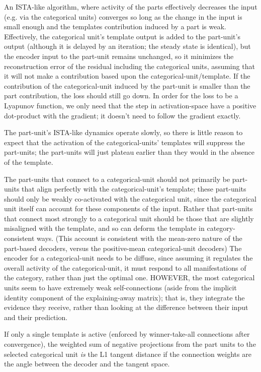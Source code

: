 \documentclass{article} %
\begin{document}
An ISTA-like algorithm, where activity of the parts effectively decreases the input (e.g. via the categorical units) converges so long as the change in the input is small enough and the templates contribution induced by a part is weak.  Effectively, the categorical unit's template output is added to the part-unit's output (although it is delayed by an iteration; the steady state is identical), but the encoder input to the part-unit remains unchanged, so it minimizes the reconstruction error of the residual including the categorical units, assuming that it will not make a contribution based upon the categorical-unit/template.  If the contribution of the categorical-unit induced by the part-unit is smaller than the part contribution, the loss should still go down.  In order for the loss to be a Lyapunov function, we only need that the step in activation-space have a positive dot-product with the gradient; it doesn't need to follow the gradient exactly.

The part-unit's ISTA-like dynamics operate slowly, so there is little reason to expect that the activation of the categorical-units' templates will suppress the part-units; the part-units will just plateau earlier than they would in the absence of the template.  


The part-units that connect to a categorical-unit should not primarily be part-units that align perfectly with the categorical-unit's template; these part-units should only be weakly co-activated with the categorical unit, since the categorical unit itself can account for these components of the input.  Rather that part-units that connect most strongly to a categorical unit should be those that are slightly misaligned with the template, and so can deform the template in category-consistent ways.  (This account is consistent with the mean-zero nature of the part-based decoders, versus the positive-mean categorical-unit decoders)  The encoder for a categorical-unit needs to be diffuse, since assuming it regulates the overall activity of the categorical-unit, it must respond to all manifestations of the category, rather than just the optimal one.  HOWEVER, the most categorical units seem to have extremely weak self-connections (aside from the implicit identity component of the explaining-away matrix); that is, they integrate the evidence they receive, rather than looking at the difference between their input and their prediction.

If only a single template is active (enforced by winner-take-all connections after convergence), the weighted sum of negative projections from the part units to the selected categorical unit \emph{is} the L1 tangent distance if the connection weights are the angle between the decoder and the tangent space.  %
\end{document}
